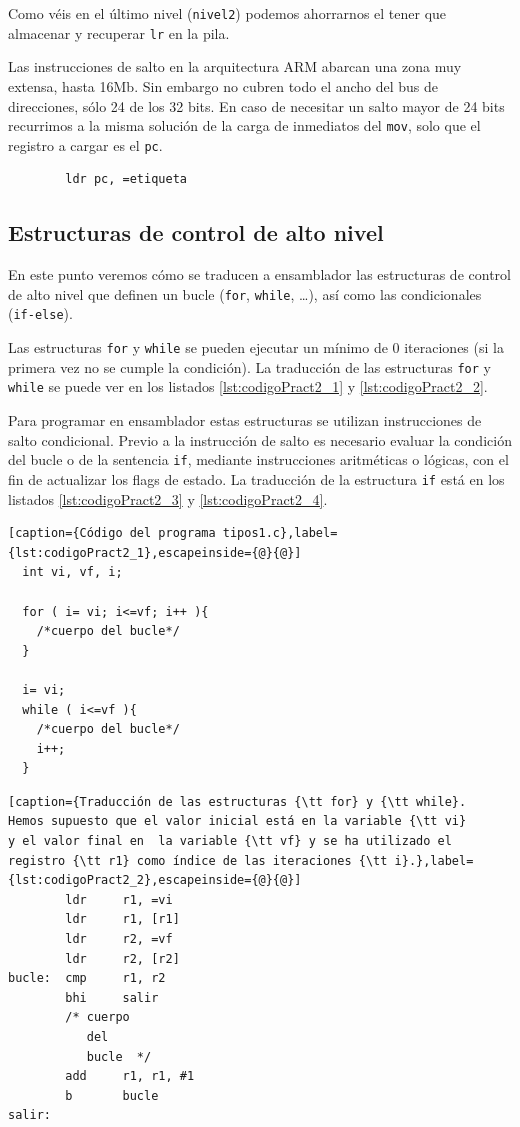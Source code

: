 Como véis en el último nivel ({\tt nivel2}) podemos ahorrarnos el tener que
almacenar y recuperar {\tt lr} en la pila.

\vspace{0.25cm}
Las instrucciones de salto en la arquitectura ARM abarcan una zona muy extensa,
hasta 16Mb. Sin embargo no cubren todo el ancho del bus de direcciones, sólo
24 de los 32 bits. En caso de necesitar un salto mayor de 24 bits recurrimos
a la misma solución de la carga de inmediatos del {\tt mov}, solo que el
registro a cargar es el {\tt pc}.

\begin{lstlisting}
        ldr pc, =etiqueta
\end{lstlisting}

\subsection{Estructuras de control de alto nivel}

En este punto veremos cómo se traducen a ensamblador las estructuras
de control de alto nivel que definen un bucle ({\tt for}, {\tt while},
\dots), así como las condicionales ({\tt if-else}).

Las estructuras {\tt for} y {\tt while} se pueden ejecutar un mínimo de 0
iteraciones (si la primera vez no se cumple la condición). La traducción de
las estructuras {\tt for} y {\tt while} se puede ver en los listados
\ref{lst:codigoPract2_1} y \ref{lst:codigoPract2_2}.

Para programar en ensamblador estas estructuras se utilizan instrucciones
de salto condicional. Previo a la instrucción de salto es necesario evaluar
la condición del bucle o de la sentencia {\tt if}, mediante instrucciones
aritméticas o lógicas, con el fin de actualizar los flags de estado. La
traducción de la estructura {\tt if} está en los listados
\ref{lst:codigoPract2_3} y \ref{lst:codigoPract2_4}.

\begin{lstlisting}[caption={Código del programa tipos1.c},label={lst:codigoPract2_1},escapeinside={@}{@}]
  int vi, vf, i;

  for ( i= vi; i<=vf; i++ ){ 
    /*cuerpo del bucle*/
  }

  i= vi; 
  while ( i<=vf ){ 
    /*cuerpo del bucle*/
    i++; 
  }
\end{lstlisting}

\begin{lstlisting}[caption={Traducción de las estructuras {\tt for} y {\tt while}.
Hemos supuesto que el valor inicial está en la variable {\tt vi}
y el valor final en  la variable {\tt vf} y se ha utilizado el
registro {\tt r1} como índice de las iteraciones {\tt i}.},label={lst:codigoPract2_2},escapeinside={@}{@}]
        ldr     r1, =vi
        ldr     r1, [r1]
        ldr     r2, =vf
        ldr     r2, [r2]
bucle:  cmp     r1, r2
        bhi     salir
        /* cuerpo
           del
           bucle  */
        add     r1, r1, #1
        b       bucle
salir:
\end{lstlisting}

